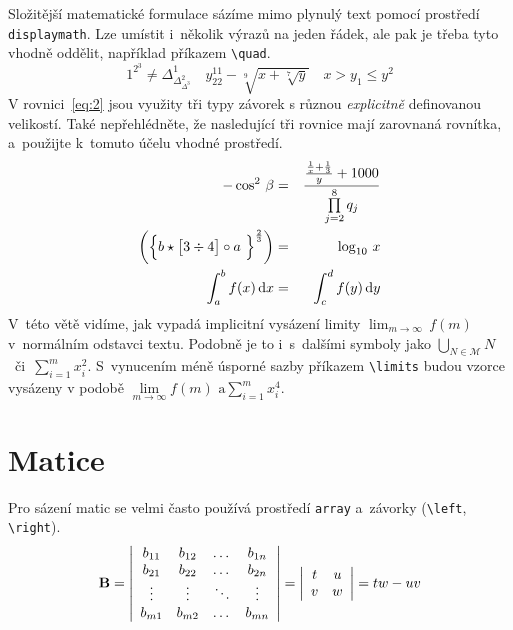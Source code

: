 \documentclass[twocolumn, 11pt, a4paper]{article}
\begin{document}
Složitější matematické formulace sázíme mimo plynulý text pomocí prostředí \verb|displaymath|. 
Lze umístit i~několik výrazů na jeden řádek, ale pak je třeba tyto vhodně oddělit, například příkazem \verb|\quad|.
\begin{displaymath}
    1^{2^3} \neq \Delta _{\Delta _{\Delta^3}^2}^1
    \quad
    y_{22}^{11} - \sqrt[9]{x + \sqrt[7]{y}} 
    \quad
    x > y_1 \leq y^2
\end{displaymath}
V rovnici~\eqref{eq:2} jsou využity tři typy závorek s různou \emph{explicitně} definovanou velikostí. Také nepřehlédněte, že nasledující 
tři rovnice mají zarovnaná rovnítka, a~použijte k~tomuto účelu vhodné prostředí.
\begin{eqnarray}
    -\cos^2\,\beta &=& \frac{\frac{\frac{1}{x} + \frac{1}{3}}{y} + 1000}{\prod\limits _{j=2}^8 q_j} \label{eq:1}\\
    \biggl(\Bigl\{ b \star \bigl[3 \div 4\bigr] \circ a~\Bigr\}^\frac{2}{3}\biggr) &=& \log_{10}\,x \label{eq:2}\\
    \int_a^b f(x)\,\mathrm{d}x &=& \int_c^d f(y)\,\mathrm{d}y \label{eq:3}
\end{eqnarray}
V~této větě vidíme, jak vypadá implicitní vysázení limity \mbox{$ \lim_{m \to \infty}\,f(m) $} v~normálním odstavci textu. 
Podobně je to i~s~dalšími symboly jako \mbox{$ \bigcup_{N \in \mathcal{M}} N $ či $ \sum _{i=1}^m x_i^2 $}. 
S~vynucením méně úsporné sazby příkazem \verb|\limits| budou vzorce vysázeny v podobě \mbox{$ \lim\limits _{m \to \infty} f(m) \text{ a} \sum\limits _{i=1}^m x_i^4 $}.

\section{Matice}

Pro sázení matic se velmi často používá prostředí \verb|array| a~závorky (\verb|\left|, \verb|\right|).
$$
\mathbf{B} = 
\left|
    \begin{array}{cccc}
        b_{11} & b_{12} & \dots & b_{1n} \\
        b_{21} & b_{22} & \dots & b_{2n} \\
        \vdots & \vdots & \ddots & \vdots \\
        b_{m1} & b_{m2} & \dots & b_{mn}
    \end{array}
\right|
=
\left|
    \begin{array}[]{cc}
        t & u \\
        v & w 
    \end{array}
\right|
=
tw - uv
$$
\end{document}
